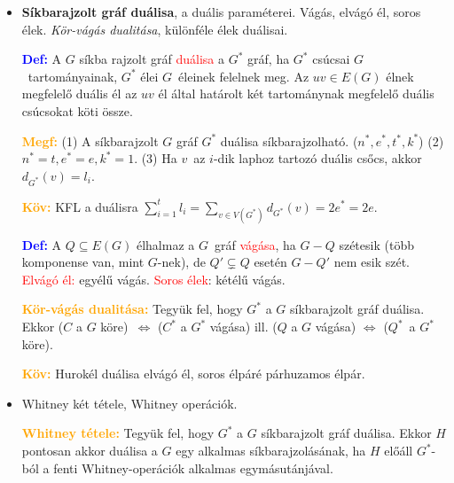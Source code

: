 \documentclass[../../szobeli.tex]{subfiles}
\begin{document}
\begin{itemize}
                (2) Ha $G$ síkbarajzolható, akkor $G$-nek nincs se topologikus $K_5$, se topologikus $K_{3,3}$ részgráfja.

            ***\textcolor{orange}{\textbf{Kuratowski tétele:}} ($G$ síkbarajzolható) $\Longleftrightarrow$ ($G$-nek nincs se topologikus $K_5$, se topologikus $K_{3,3}$ részgráfja) \textcolor{violet}{\textbf{Példa:}} Petersen-gráf

        \item \textbf{Síkbarajzolt gráf duálisa}, a duális paraméterei. Vágás, elvágó él, soros élek. \textit{Kör-vágás dualitása}, különféle élek duálisai.

            \textcolor{blue}{\textbf{Def:}} A $G$ síkba rajzolt gráf \textcolor{red}{duálisa} a $G^*$ gráf, ha $G^*$ csúcsai $G$ tartományainak, $G^*$ élei $G$ éleinek felelnek meg. Az $uv \in E(G)$ élnek megfelelő duális él az $uv$ él által határolt két tartománynak megfelelő duális csúcsokat köti össze. 

            \textcolor{orange}{\textbf{Megf:}} (1) A síkbarajzolt $G$ gráf $G^*$ duálisa síkbarajzolható. ($n^*, e^*, t^*, k^*$) (2) $n^* = t, e^* = e, k^* = 1$. (3) Ha $v$ az $i$-dik laphoz tartozó duális csőcs, akkor $d_{G^*}(v) = l_i$.

            \textcolor{orange}{\textbf{Köv:}} KFL a duálisra $\sum_{i = 1}^{t} l_i = \sum_{v \in V(G^*)}d_{G^*}(v) = 2e^* = 2e$.

            \textcolor{blue}{\textbf{Def:}} A $Q \subseteq E(G)$ élhalmaz a $G$ gráf \textcolor{red}{vágása}, ha $G - Q$ szétesik (több komponense van, mint $G$-nek), de $Q' \subsetneq Q$ esetén $G - Q'$ nem esik szét. \textcolor{red}{Elvágó él:} egyélű vágás. \textcolor{red}{Soros élek}: kétélű vágás.

            \textcolor{orange}{\textbf{Kör-vágás dualitása:}} Tegyük fel, hogy $G^*$ a $G$ síkbarajzolt gráf duálisa. Ekkor ($C$ a $G$ köre) $\Longleftrightarrow$ ($C^*$ a $G^*$ vágása) ill. ($Q$ a $G$ vágása) $\Longleftrightarrow$ ($Q^*$ a $G^*$ köre). 

            \textcolor{orange}{\textbf{Köv:}} Hurokél duálisa elvágó él, soros élpáré párhuzamos élpár.

        \item Whitney két tétele, Whitney operációk.

            \textcolor{orange}{\textbf{Whitney tétele:}} Tegyük fel, hogy $G^*$ a $G$ síkbarajzolt gráf duálisa. Ekkor $H$ pontosan akkor duálisa a $G$ egy alkalmas síkbarajzolásának, ha $H$ előáll $G^*$-ból a fenti Whitney-operációk alkalmas egymásutánjával.


\end{itemize}
\end{document}
